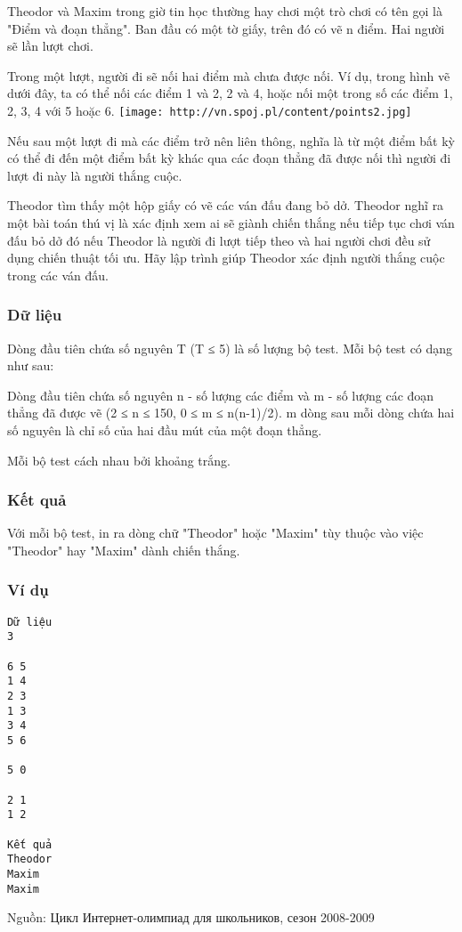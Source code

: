 



   Theodor và Maxim trong giờ tin học thường hay chơi một trò chơi có tên gọi là "Điểm và đoạn thẳng". Ban đầu có một tờ giấy, trên đó có vẽ n điểm. Hai người sẽ lần lượt chơi.  

   Trong một lượt, người đi sẽ nối hai điểm mà chưa được nối. Ví dụ, trong hình vẽ dưới đây, ta có thể nối các điểm 1 và 2, 2 và 4, hoặc nối một trong số các điểm 1, 2, 3, 4 với 5 hoặc 6.  
\texttt{[image: http://vn.spoj.pl/content/points2.jpg]}

   Nếu sau một lượt đi mà các điểm trở nên liên thông, nghĩa là từ một điểm bất kỳ có thể đi đến một điểm bất kỳ khác qua các đoạn thẳng đã được nối thì người đi lượt đi này là người thắng cuộc.  

   Theodor tìm thấy một hộp giấy có vẽ các ván đấu đang bỏ dở. Theodor nghĩ ra một bài toán thú vị là xác định xem ai sẽ giành chiến thắng nếu tiếp tục chơi ván đấu bỏ dở đó nếu Theodor là người đi lượt tiếp theo và hai người chơi đều sử dụng chiến thuật tối ưu. Hãy lập trình giúp Theodor xác định người thắng cuộc trong các ván đấu.  

\subsubsection{   Dữ liệu  }

   Dòng đầu tiên chứa số nguyên T (T ≤ 5) là số lượng bộ test. Mỗi bộ test có dạng như sau:  

   Dòng đầu tiên chứa số nguyên n - số lượng các điểm và m - số lượng các đoạn thẳng đã được vẽ (2 ≤ n ≤ 150, 0 ≤ m ≤ n(n-1)/2). m dòng sau mỗi dòng chứa hai số nguyên là chỉ số của hai đầu mút của một đoạn thẳng.  

   Mỗi bộ test cách nhau bởi khoảng trắng.  

\subsubsection{   Kết quả  }

   Với mỗi bộ test, in ra dòng chữ "Theodor" hoặc "Maxim" tùy thuộc vào việc "Theodor" hay "Maxim" dành chiến thắng.  

\subsubsection{   Ví dụ  }
\begin{verbatim}
Dữ liệu
3

6 5
1 4
2 3
1 3
3 4
5 6

5 0

2 1
1 2

Kết quả
Theodor
Maxim
Maxim 
\end{verbatim}

   Nguồn: Цикл Интернет-олимпиад для школьников, сезон 2008-2009  
